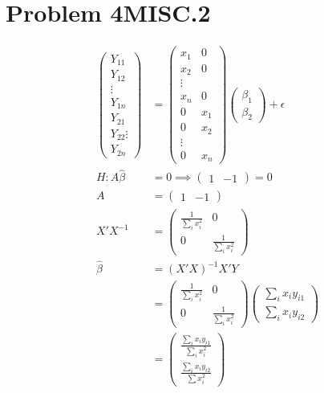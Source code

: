\documentclass[a4paper]{article}
\begin{document}
\section*{Problem 4MISC.2}
\begin{align*}
\begin{pmatrix}
Y_{11}\\
Y_{12}\\
\vdots\\
Y_{1n}\\
Y_{21}\\
Y_{22}
\vdots\\
Y_{2n}
\end{pmatrix}&= \begin{pmatrix}x_1 & 0\\
x_2 & 0 \\
\vdots \\
x_n & 0\\
0 & x_1\\
0 & x_2\\
\vdots\\
0 & x_n
\end{pmatrix}\begin{pmatrix}\beta_1 \\ \beta_2\end{pmatrix} + \epsilon\\
H: A\hat{\beta} &=0 \implies \begin{pmatrix} 1 & -1 \end{pmatrix} = 0\\
A &= \begin{pmatrix} 1 & -1 \end{pmatrix}\\
X'X^{-1} &= \begin{pmatrix}\frac{1}{\sum_i x_i^2} & 0\\
0 & \frac{1}{\sum_i x_i^2}\end{pmatrix}\\
\hat{\beta} &= (X'X)^{-1}X'Y\\
&= \begin{pmatrix}\frac{1}{\sum_i x_i^2} & 0\\
0 & \frac{1}{\sum_i x_i^2}\end{pmatrix}  \begin{pmatrix}\sum_ix_i y_{i1}\\ \sum_i x_iy_{i2}\end{pmatrix}\\
&= \begin{pmatrix}\frac{\sum_ix_i y_{i1}}{\sum_i x_i^2}\\ \frac{\sum_i x_iy_{i2}}{\sum x_i^2}\end{pmatrix}\\

\end{align*}
\end{document}
